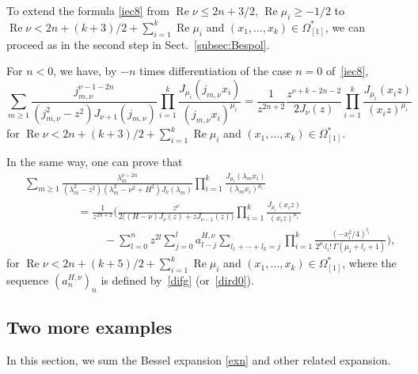 \documentclass[12pt,leqno]{amsart}
\numberwithin{equation}{section}
\theoremstyle{plain}
\renewcommand{\Re}{\operatorname{Re}}
\begin{document}
To extend the formula \eqref{iec8} from $\Re \nu\le 2n+3/2$, $\Re \mu_i\ge -1/2$ to
$\Re\nu<2n+(k+3)/2+ \sum_{i=1}^k\Re \mu_i$ and $(x_1,\dots,x_k)\in\Omega^*_{[1]}$, we can proceed as in the second step in Sect.~\ref{subsec:Bespol}.

For $n<0$, we have, by $-n$ times differentiation of the case $n=0$ of~\eqref{iec8},
\[
\sum_{m\ge 1} \frac{j_{m,\nu}^{\nu-1-2n}}{(j_{m,\nu}^{2}-z^2)J_{\nu+1}(j_{m,\nu})}
\prod_{i=1}^k \frac{J_{\mu_i}(j_{m,\nu}x_i)}{(j_{m,\nu}x_i)^{\mu_i}} 
= \frac{1}{z^{2n+2}}\frac{z^{\nu+k-2n-2}}{2J_\nu(z)}
\prod_{i=1}^k \frac{J_{\mu_i}(x_i z)}{(x_i z)^{\mu_i}}
\]
for $\Re \nu<2n+(k+3)/2+ \sum_{i=1}^k\Re \mu_i$ and $(x_1,\dots, x_k)\in \Omega_{[1]}^*$.

\bigskip

In the same way, one can prove that
\begin{align*}
& \sum_{m\ge 1} \frac{\lambda_m^{\nu-2n}}{(\lambda_m^2-z^2)(\lambda_m^2-\nu^2+H^2)J_\nu(\lambda_m)}
\prod_{i=1}^k \frac{J_{\mu_i}(\lambda_m x_i)}{(\lambda_m x_i)^{\mu_i}} \\
& \hspace{2cm} = \frac{1}{z^{2n+2}} \Bigg( \frac{z^{\nu}}{2\big((H-\nu)J_\nu(z)+zJ_{\nu-1}(z)\big)}
\prod_{i=1}^k \frac{J_{\mu_i}(x_i z)}{(x_i z)^{\mu_i}} \\
& \hspace{3cm} - \sum_{l=0}^nz^{2l} \sum_{j=0}^l
a_{l-j}^{H,\nu} \sum_{l_1+\cdots+l_k=j}
\prod_{i=1}^k\frac{(-x_i^2/4)^{l_i}}
   {2^{\mu_i}l_i!\, \Gamma(\mu_i + l_i+1)} \Bigg),
\end{align*}
for $\Re \nu<2n+(k+5)/2+ \sum_{i=1}^k\Re \mu_i$ and $(x_1,\dots, x_k)\in \Omega^*_{[1]}$, where the sequence $(a_n^{H,\nu})_n$ is defined by~\eqref{difg} (or~\eqref{dird0}).

\subsection{Two more examples}

In this section, we sum the Bessel expansion \eqref{exn} and other related expansion.
\end{document}
